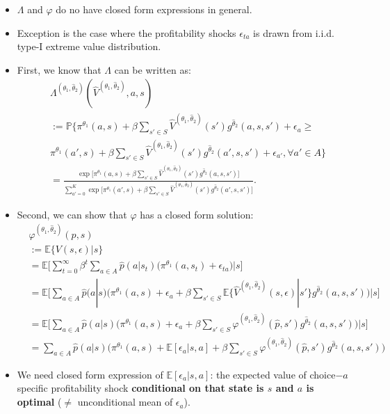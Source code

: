 \documentclass[
]{book}
\providecommand{\tightlist}{%
  \setlength{\itemsep}{0pt}\setlength{\parskip}{0pt}}
\begin{document}
\begin{itemize}
\tightlist
\item
  \(\Lambda\) and \(\varphi\) do no have closed form expressions in general.
\item
  Exception is the case where the profitability shocks \(\epsilon_{ta}\) is drawn from i.i.d. type-I extreme value distribution.
\item
  First, we know that \(\Lambda\) can be written as:
  \begin{equation}
  \begin{split}
  &\Lambda^{(\theta_1, \hat{\theta}_2)}(\hat{V}^{(\theta_1, \hat{\theta}_2)}, a, s)\\
  &:= \mathbb{P}\Bigg\{\pi^{\theta_1}(a , s) + \beta \sum_{s' \in S} \hat{V}^{(\theta_1, \hat{\theta}_2)}(s') g^{\hat{\theta}_2}(a, s, s') + \epsilon_a \ge\\
  &\pi^{\theta_1}(a' , s) + \beta \sum_{s' \in S} \hat{V}^{(\theta_1, \hat{\theta}_2)}(s') g^{\hat{\theta}_2}(a', s, s') + \epsilon_{a'}, \forall a' \in A \Bigg\}\\
  &=\frac{\exp\Big[\pi^{\theta_1}(a , s) + \beta \sum_{s' \in S}\hat{V}^{(\theta_1, \hat{\theta}_2)}(s') g^{\hat{\theta}_2}(a, s, s')\Big]}{\sum_{a' = 0}^K \exp\Big[\pi^{\theta_1}(a' , s) + \beta \sum_{s' \in S} \hat{V}^{(\theta_1, \hat{\theta}_2)}(s') g^{\hat{\theta}_2}(a', s, s') \Big]}.
  \end{split}
  \end{equation}
\item
  Second, we can show that \(\varphi\) has a closed form solution:
  \begin{equation}
  \begin{split}
  &\varphi^{(\theta_1, \hat{\theta}_2)}(p, s)\\
  &:= \mathbb{E}\{V(s, \epsilon)|s\}\\
  &= \mathbb{E}\Bigg[ \sum_{t = 0}^\infty \beta^t \sum_{a \in A}\hat{p}(a|s_t)\Bigg(\pi^{\theta_1}(a, s_t) + \epsilon_{ta}\Bigg)\Bigg|s\Bigg]\\
  &=\mathbb{E}\Bigg[\sum_{a \in A}\hat{p}(a|s)\Bigg(\pi^{\theta_1}(a, s) + \epsilon_{a} + \beta \sum_{s' \in S} \mathbb{E}\{\hat{V}^{(\theta_1, \hat{\theta}_2)}(s, \epsilon)|s'\} g^{\hat{\theta}_2}(a, s, s')  \Bigg)\Bigg|s\Bigg]\\
  &=\mathbb{E}\Bigg[\sum_{a \in A}\hat{p}(a|s)\Bigg(\pi^{\theta_1}(a, s) + \epsilon_{a} + \beta \sum_{s' \in S} \varphi^{(\theta_1, \hat{\theta}_2)}(\hat{p}, s') g^{\hat{\theta}_2}(a, s, s')  \Bigg)\Bigg|s\Bigg]\\
  &=\sum_{a \in A}\hat{p}(a|s)\Bigg(\pi^{\theta_1}(a, s) + \mathbb{E}[\epsilon_{a}|s, a] + \beta \sum_{s' \in S} \varphi^{(\theta_1, \hat{\theta}_2)}(\hat{p}, s') g^{\hat{\theta}_2}(a, s, s')  \Bigg)
  \end{split}
  \end{equation}
\item
  We need closed form expression of \(\mathbb{E}[\epsilon_{a}|s, a]\): the expected value of choice\(-a\) specific profitability shock \textbf{conditional on that state is \(s\) and \(a\) is optimal} (\(\neq\) unconditional mean of \(\epsilon_a\)).
\end{itemize}
\end{document}
